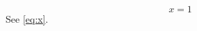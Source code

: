 \documentclass{article}
\begin{document}
\begin{equation}x=1\label{eq:x}\end{equation}See \ref{eq:x}.
\end{document}
